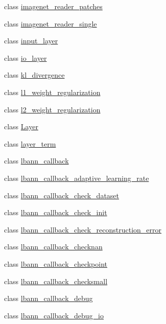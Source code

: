 \begin{DoxyCompactItemize}
\item 
class \hyperlink{classlbann_1_1imagenet__reader__patches}{imagenet\+\_\+reader\+\_\+patches}
\item 
class \hyperlink{classlbann_1_1imagenet__reader__single}{imagenet\+\_\+reader\+\_\+single}
\item 
class \hyperlink{classlbann_1_1input__layer}{input\+\_\+layer}
\item 
class \hyperlink{classlbann_1_1io__layer}{io\+\_\+layer}
\item 
class \hyperlink{classlbann_1_1kl__divergence}{kl\+\_\+divergence}
\item 
class \hyperlink{classlbann_1_1l1__weight__regularization}{l1\+\_\+weight\+\_\+regularization}
\item 
class \hyperlink{classlbann_1_1l2__weight__regularization}{l2\+\_\+weight\+\_\+regularization}
\item 
class \hyperlink{classlbann_1_1Layer}{Layer}
\item 
class \hyperlink{classlbann_1_1layer__term}{layer\+\_\+term}
\item 
class \hyperlink{classlbann_1_1lbann__callback}{lbann\+\_\+callback}
\item 
class \hyperlink{classlbann_1_1lbann__callback__adaptive__learning__rate}{lbann\+\_\+callback\+\_\+adaptive\+\_\+learning\+\_\+rate}
\item 
class \hyperlink{classlbann_1_1lbann__callback__check__dataset}{lbann\+\_\+callback\+\_\+check\+\_\+dataset}
\item 
class \hyperlink{classlbann_1_1lbann__callback__check__init}{lbann\+\_\+callback\+\_\+check\+\_\+init}
\item 
class \hyperlink{classlbann_1_1lbann__callback__check__reconstruction__error}{lbann\+\_\+callback\+\_\+check\+\_\+reconstruction\+\_\+error}
\item 
class \hyperlink{classlbann_1_1lbann__callback__checknan}{lbann\+\_\+callback\+\_\+checknan}
\item 
class \hyperlink{classlbann_1_1lbann__callback__checkpoint}{lbann\+\_\+callback\+\_\+checkpoint}
\item 
class \hyperlink{classlbann_1_1lbann__callback__checksmall}{lbann\+\_\+callback\+\_\+checksmall}
\item 
class \hyperlink{classlbann_1_1lbann__callback__debug}{lbann\+\_\+callback\+\_\+debug}
\item 
class \hyperlink{classlbann_1_1lbann__callback__debug__io}{lbann\+\_\+callback\+\_\+debug\+\_\+io}
\item 

\end{DoxyCompactItemize}
